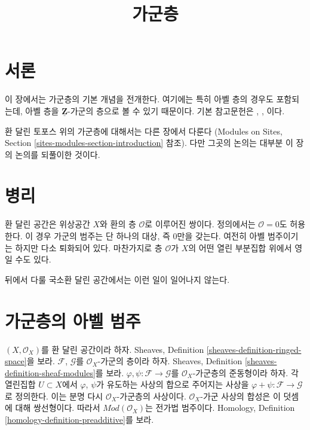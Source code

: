 

%


\title{가군층}


\maketitle

\label{section-phantom}

\tableofcontents

\section{서론}
\label{section-introduction}

\noindent
이 장에서는 가군층의 기본 개념을 전개한다. 여기에는 특히 아벨 층의 경우도
포함되는데, 아벨 층을 $\underline{\mathbf{Z}}$-가군의 층으로 볼 수 있기 때문이다.
기본 참고문헌은 \cite{FAC}, \cite{EGA}, \cite{SGA4}이다.

\medskip\noindent
환 달린 토포스 위의 가군층에 대해서는 다른 장에서 다룬다
(Modules on Sites, Section \ref{sites-modules-section-introduction} 참조).
다만 그곳의 논의는 대부분 이 장의 논의를 되풀이한 것이다.





\section{병리}
\label{section-pathology}

\noindent
환 달린 공간은 위상공간 $X$와 환의 층 $\mathcal{O}$로 이루어진 쌍이다.
정의에서는 $\mathcal{O} = 0$도 허용한다. 이 경우 가군의 범주는 단 하나의 대상,
즉 $0$만을 갖는다. 여전히 아벨 범주이기는 하지만 다소 퇴화되어 있다.
마찬가지로 층 $\mathcal{O}$가 $X$의 어떤 열린 부분집합 위에서 영일 수도 있다.

\medskip\noindent
뒤에서 다룰 국소환 달린 공간에서는 이런 일이 일어나지 않는다.








\section{가군층의 아벨 범주}
\label{section-kernels}

\noindent
$(X, \mathcal{O}_X)$를 환 달린 공간이라 하자. Sheaves, Definition
\ref{sheaves-definition-ringed-space}을 보라.
$\mathcal{F}$, $\mathcal{G}$를 $\mathcal{O}_X$-가군의 층이라 하자. Sheaves,
Definition \ref{sheaves-definition-sheaf-modules}를 보라.
$\varphi, \psi : \mathcal{F} \to \mathcal{G}$를 $\mathcal{O}_X$-가군층의
준동형이라 하자. 각 열린집합 $U \subset X$에서 $\varphi$, $\psi$가 유도하는
사상의 합으로 주어지는 사상을 $\varphi + \psi : \mathcal{F} \to \mathcal{G}$로
정의한다. 이는 분명 다시 $\mathcal{O}_X$-가군층의 사상이다.
$\mathcal{O}_X$-가군 사상의 합성은 이 덧셈에 대해 쌍선형이다. 따라서
$\textit{Mod}(\mathcal{O}_X)$는 전가법 범주이다. Homology, Definition
\ref{homology-definition-preadditive}를 보라.

